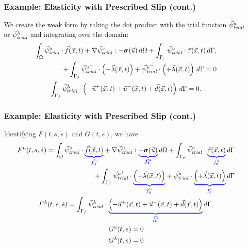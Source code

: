 \documentclass[aspectratio=169]{beamer}
\begin{document}
\begin{frame}
  \frametitle{Example: Elasticity with Prescribed Slip (cont.)}
  \summary{}

We create the weak form by taking the dot product with the trial function $\trialvec[u]$ or $\trialvec[\lambda]$ and integrating over the domain:
\begin{gather}
  \begin{split}
  \int_\Omega \trialvec[u] \cdot \vec{f}(\vec{x},t) + \nabla \trialvec[v] : -\tensor{\sigma}(\vec{u}) \, d\Omega
  + \int_{\Gamma_\tau} \trialvec[u] \cdot \vec{\tau}(\vec{x},t) \, d\Gamma, \\
  + \int_{\Gamma_{f}} \trialvec[u^+] \cdot \left(-\vec{\lambda}(\vec{x},t)\right)
  + \trialvec[u^-] \cdot \left(+\vec{\lambda}(\vec{x},t)\right)\, d\Gamma = 0
\end{split}\\
  \int_{\Gamma_{f}} \trialvec[\lambda] \cdot \left(
    -\vec{u}^+(\vec{x},t) + \vec{u}^-(\vec{x},t) + \vec{d}(\vec{x},t) \right) \, d\Gamma = 0.
\end{gather}

\end{frame}


\begin{frame}
  \frametitle{Example: Elasticity with Prescribed Slip (cont.)}
  \summary{}

Identifying $F(t,s,\dot{s})$ and $G(t,s)$, we have
\begin{gather}
  \begin{split}
F^u(t,s,\dot{s}) = \int_\Omega \trialvec[u] \cdot \eqnannotate{\vec{f}(\vec{x},t)}{\vec{f}^u_0} + \nabla \trialvec[u] : \eqnannotate{-\tensor{\sigma}(\vec{u})}{\tensor{f^u_1}} \, d\Omega
  + \int_{\Gamma_\tau} \trialvec[u] \cdot \eqnannotate{\vec{\tau}(\vec{x},t)}{\vec{f}^u_0} \, d\Gamma\\ 
  + \int_{\Gamma_{f}} \trialvec[u^+] \cdot \eqnannotate{\left(-\vec{\lambda}(\vec{x},t)\right)}{\vec{f}^u_0}
  + \trialvec[u^-] \cdot \eqnannotate{\left(+\vec{\lambda}(\vec{x},t)\right)}{\vec{f}^u_0}\, d\Gamma
  \end{split}\\
  F^\lambda(t,s,\dot{s}) = \int_{\Gamma_{f}} \trialvec[\lambda] \cdot \eqnannotate{\left(
    -\vec{u}^+(\vec{x},t) + \vec{u}^-(\vec{x},t) + \vec{d}(\vec{x},t) \right)}{\vec{f}^\lambda_0} \, d\Gamma, \\
  G^u(t,s) = 0 \\
  G^\lambda(t,s) = 0
\end{gather}

\end{frame}
\end{document}
